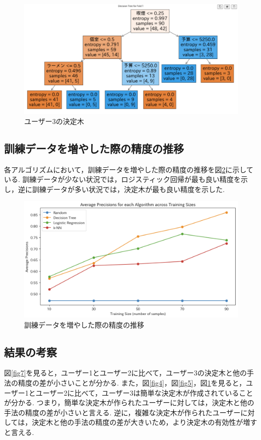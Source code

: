 \documentclass[12pt,a4j]{jreport}
\begin{document}
\begin{figure}[htbp]
  \begin{center}
    \includegraphics[width=12cm]{fig6.png}
    \caption{ユーザー3の決定木}
    \label{fig6}
  \end{center}
\end{figure}

\subsection{訓練データを増やした際の精度の推移}
各アルゴリズムにおいて，訓練データを増やした際の精度の推移を図\ref{fig9}に示している.
訓練データが少ない状況では，ロジスティック回帰が最も良い精度を示し，逆に訓練データが多い状況では，決定木が最も良い精度を示した.\\

\begin{figure}[htbp]
  \begin{center}
    \includegraphics[width=14cm]{fig9.png}
    \caption{訓練データを増やした際の精度の推移}
    \label{fig9}
  \end{center}
\end{figure}

\subsection{結果の考察}
図\ref{fig7}を見ると，ユーザー1とユーザー2に比べて，ユーザー3の決定木と他の手法の精度の差が小さいことが分かる.
また，図\ref{fig4}，図\ref{fig5}，図\ref{fig6}を見ると，ユーザー1とユーザー2に比べて，ユーザー3は簡単な決定木が作成されていることが分かる.
つまり，簡単な決定木が作られたユーザーに対しては，決定木と他の手法の精度の差が小さいと言える.
逆に，複雑な決定木が作られたユーザーに対しては，決定木と他の手法の精度の差が大きいため，より決定木の有効性が増すと言える.
\end{document}
